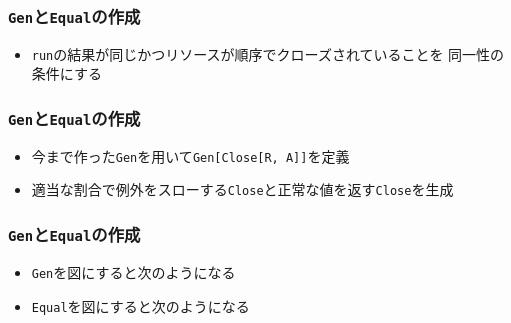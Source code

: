 \begin{frame}
  \frametitle{\protect\lstinline|Gen|と\protect\lstinline|Equal|の作成}

  

  \begin{itemize}
    \item<2-> \lstinline|run|の結果が同じかつリソースが順序でクローズされていることを
    同一性の条件にする
  \end{itemize}
\end{frame}

\begin{frame}
  \frametitle{\protect\lstinline|Gen|と\protect\lstinline|Equal|の作成}

  

  \begin{itemize}
    \item<2-> 今まで作った\lstinline|Gen|を用いて\lstinline|Gen[Close[R, A]]|を定義
    \item<3-> 適当な割合で例外をスローする\lstinline|Close|と正常な値を返す\lstinline|Close|を生成
  \end{itemize}
\end{frame}

\begin{frame}
  \frametitle{\protect\lstinline|Gen|と\protect\lstinline|Equal|の作成}

  \begin{itemize}
    \item<1-> \lstinline|Gen|を図にすると次のようになる
    \begin{center}
    \end{center}

    \item<3-> \lstinline|Equal|を図にすると次のようになる
    \begin{center}
    \end{center}
  \end{itemize}
\end{frame}

